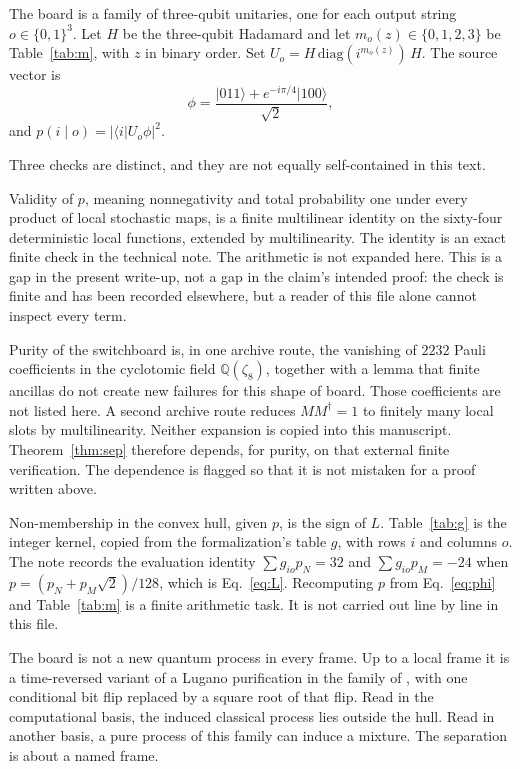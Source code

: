 \documentclass[11pt]{article}
\theoremstyle{definition}
\begin{document}
The board is a family of three-qubit unitaries, one for each output string \(o\in\{0,1\}^3\). Let \(H\) be the three-qubit Hadamard and let \(m_o(z)\in\{0,1,2,3\}\) be Table~\ref{tab:m}, with \(z\) in binary order. Set \(U_o=H\,\mathrm{diag}(i^{m_o(z)})\,H\). The source vector is
\begin{equation}
\label{eq:phi}
\phi=\frac{\lvert 011\rangle+e^{-i\pi/4}\lvert 100\rangle}{\sqrt{2}},
\end{equation}
and \(p(i\mid o)=\lvert\langle i\rvert U_o\phi\rvert^2\).

Three checks are distinct, and they are not equally self-contained in this text.

Validity of \(p\), meaning nonnegativity and total probability one under every product of local stochastic maps, is a finite multilinear identity on the sixty-four deterministic local functions, extended by multilinearity. The identity is an exact finite check in the technical note. The arithmetic is not expanded here. This is a gap in the present write-up, not a gap in the claim's intended proof: the check is finite and has been recorded elsewhere, but a reader of this file alone cannot inspect every term.

Purity of the switchboard is, in one archive route, the vanishing of \(2232\) Pauli coefficients in the cyclotomic field \(\mathbb{Q}(\zeta_8)\), together with a lemma that finite ancillas do not create new failures for this shape of board. Those coefficients are not listed here. A second archive route reduces \(MM^{\dagger}=1\) to finitely many local slots by multilinearity. Neither expansion is copied into this manuscript. Theorem~\ref{thm:sep} therefore depends, for purity, on that external finite verification. The dependence is flagged so that it is not mistaken for a proof written above.

Non-membership in the convex hull, given \(p\), is the sign of \(L\). Table~\ref{tab:g} is the integer kernel, copied from the formalization's table \(g\), with rows \(i\) and columns \(o\). The note records the evaluation identity \(\sum g_{io}p_N=32\) and \(\sum g_{io}p_M=-24\) when \(p=(p_N+p_M\sqrt{2})/128\), which is Eq.~\eqref{eq:L}. Recomputing \(p\) from Eq.~\eqref{eq:phi} and Table~\ref{tab:m} is a finite arithmetic task. It is not carried out line by line in this file.

The board is not a new quantum process in every frame. Up to a local frame it is a time-reversed variant of a Lugano purification in the family of \cite{guerin2018}, with one conditional bit flip replaced by a square root of that flip. Read in the computational basis, the induced classical process lies outside the hull. Read in another basis, a pure process of this family can induce a mixture. The separation is about a named frame.
\end{document}
